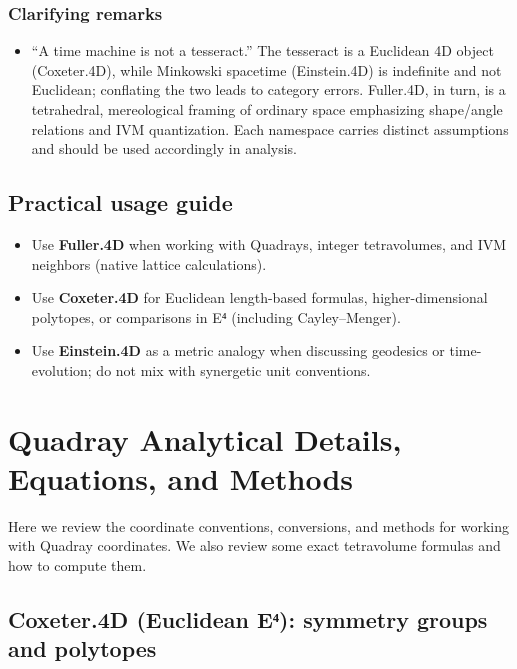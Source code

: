 \documentclass[
  10pt,
]{article}
\providecommand{\tightlist}{%
  \setlength{\itemsep}{0pt}\setlength{\parskip}{0pt}}
\begin{document}
\hypertarget{clarifying-remarks}{%
\subsubsection{Clarifying remarks}\label{clarifying-remarks}}

\begin{itemize}
\tightlist
\item
  ``A time machine is not a tesseract.'' The tesseract is a Euclidean 4D
  object (Coxeter.4D), while Minkowski spacetime (Einstein.4D) is
  indefinite and not Euclidean; conflating the two leads to category
  errors. Fuller.4D, in turn, is a tetrahedral, mereological framing of
  ordinary space emphasizing shape/angle relations and IVM quantization.
  Each namespace carries distinct assumptions and should be used
  accordingly in analysis.
\end{itemize}

\hypertarget{practical-usage-guide}{%
\subsection{Practical usage guide}\label{practical-usage-guide}}

\begin{itemize}
\tightlist
\item
  Use \textbf{Fuller.4D} when working with Quadrays, integer
  tetravolumes, and IVM neighbors (native lattice calculations).
\item
  Use \textbf{Coxeter.4D} for Euclidean length-based formulas,
  higher-dimensional polytopes, or comparisons in E⁴ (including
  Cayley--Menger).
\item
  Use \textbf{Einstein.4D} as a metric analogy when discussing geodesics
  or time-evolution; do not mix with synergetic unit conventions. 
\end{itemize}

\hypertarget{quadray-analytical-details-equations-and-methods}{%
\section{Quadray Analytical Details, Equations, and
Methods}\label{quadray-analytical-details-equations-and-methods}}

Here we review the coordinate conventions, conversions, and methods for
working with Quadray coordinates. We also review some exact tetravolume
formulas and how to compute them.

\hypertarget{coxeter.4d-euclidean-eux2074-symmetry-groups-and-polytopes}{%
\subsection{Coxeter.4D (Euclidean E⁴): symmetry groups and
polytopes}\label{coxeter.4d-euclidean-eux2074-symmetry-groups-and-polytopes}}
\end{document}
